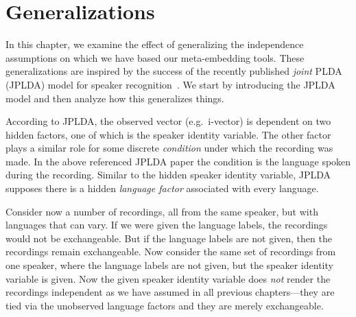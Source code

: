 \documentclass[a4paper,oneside,12pt,english]{report}
\def\Lset{\mathcal{L}}
\def\Rset{\mathcal{R}}
\begin{document}
   

%


\chapter{Generalizations}
\def\ellvec{\boldsymbol{\ell}}
\def\Amat{\mathbf{A}}
\def\Qmat{\mathbf{Q}}
In this chapter, we examine the effect of generalizing the independence assumptions on which we have based our meta-embedding tools. These generalizations are inspired by the success of the recently published \emph{joint} PLDA (JPLDA) model for speaker recognition~\cite{JPLDA}. We start by introducing the JPLDA model and then analyze how this generalizes things.

According to JPLDA, the observed vector (e.g.\ i-vector) is dependent on two hidden factors, one of which is the speaker identity variable. The other factor plays a similar role for some discrete \emph{condition} under which the recording was made. In the above referenced JPLDA paper the condition is the language spoken during the recording. Similar to the hidden speaker identity variable, JPLDA supposes there is a hidden \emph{language factor} associated with every language. 

Consider now a number of recordings, all from the same speaker, but with languages that can vary. If we were given the language labels, the recordings would not be exchangeable. But if the language labels are not given, then the recordings remain exchangeable. Now consider the same set of recordings from one speaker, where the language labels are not given, but the speaker identity variable is given. Now the given speaker identity variable does \emph{not} render the recordings independent as we have assumed in all previous chapters---they are tied via the unobserved language factors and they are merely exchangeable. 
\end{document}
